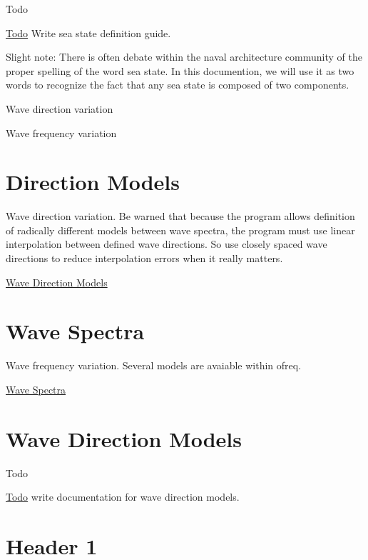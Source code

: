 \begin{DoxyRefDesc}{Todo}
\item[\hyperlink{todo__todo000038}{Todo}]Write sea state definition guide.\end{DoxyRefDesc}


Slight note\-: There is often debate within the naval architecture community of the proper spelling of the word sea state. In this documention, we will use it as two words to recognize the fact that any sea state is composed of two components.


\begin{DoxyItemize}
\item Wave direction variation
\item Wave frequency variation
\end{DoxyItemize}

\section*{Direction Models}

Wave direction variation. Be warned that because the program allows definition of radically different models between wave spectra, the program must use linear interpolation between defined wave directions. So use closely spaced wave directions to reduce interpolation errors when it really matters.

\hyperlink{wave_direction_models}{Wave Direction Models}

\section*{Wave Spectra}

Wave frequency variation. Several models are avaiable within ofreq.

\hyperlink{wave_spectra}{Wave Spectra} \hypertarget{wave_direction_models}{}\section{Wave Direction Models}\label{wave_direction_models}
\begin{DoxyRefDesc}{Todo}
\item[\hyperlink{todo__todo000031}{Todo}]write documentation for wave direction models.\end{DoxyRefDesc}


\section*{Header 1}

